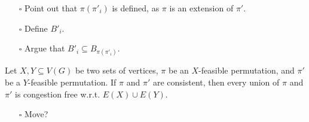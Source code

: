 \documentclass[fontsize=11pt,paper=a4]{book}
\begin{document}
\begin{itemize}
\item[{$\square$}] Point out that \(\pi(\pi'_i)\) is defined, as \(\pi\) is an extension of \(\pi'\).
\item[{$\square$}] Define \(B'_i\).
\item[{$\square$}] Argue that \(B'_i\subseteq B_{\pi(\pi'_i)}\).
\end{itemize}

\begin{lem}
Let \(X,Y\subseteq V(G)\) be two sets of vertices, \(\pi\) be an \(X\)-feasible permutation, and \(\pi'\) be a \(Y\)-feasible permutation.
If \(\pi\) and \(\pi'\) are consistent, then every union of \(\pi\) and \(\pi'\) is congestion free w.r.t. \(E(X)\cup E(Y)\).
\label{orga3bba9e}
\end{lem}

\begin{itemize}
\item[{$\square$}] Move?
\end{itemize}
\end{document}
